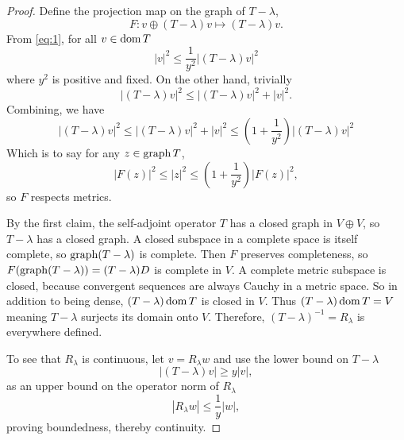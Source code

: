 \documentclass[11pt]{amsart}
\begin{document}
\begin{proof}
		Define the projection map on the graph of $T-\lambda$,
			\begin{equation*}
				F:v\oplus(T-\lambda)v \longmapsto (T-\lambda)v.
			\end{equation*}
		From \eqref{eq:1}, for all $v \in \operatorname{dom} T$ 
			\begin{equation*}
				|v|^2 \leq \frac{1}{y^2} |(T-\lambda)v|^2
			\end{equation*}
		where $y^2$ is positive and fixed. On the other hand, trivially
			\begin{equation*}
				|(T-\lambda)v|^2 \leq |(T-\lambda)v|^2 +|v|^2.
			\end{equation*}
		Combining, we have 
			\begin{equation*}
				|(T-\lambda)v|^2 \leq |(T-\lambda)v|^2 +|v|^2 \leq (1+\frac{1}{y^2}) |(T-\lambda)v|^2
			\end{equation*}
		Which is to say for any $z \in \operatorname{graph} T$,
			\begin{equation*}
				|F(z)|^2 \leq |z|^2 \leq (1+\frac{1}{y^2})|F(z)|^2,
			\end{equation*}
		so $F$ respects metrics.
		
		By the first claim, the self-adjoint operator $T$ has a closed graph in $V \oplus V$,  so $T-\lambda$ has a closed graph. A closed subspace in a complete space is itself complete, so $\operatorname{graph} (T-\lambda)$ is complete. Then $F$ preserves completeness, so $F(\operatorname{graph}(T-\lambda))=(T-\lambda)D$ is complete in $V$. A  complete metric subspace is closed, because convergent sequences are always Cauchy in a metric space. So in addition to being dense, $(T-\lambda)\operatorname{dom} T$ is closed in $V$. Thus $(T-\lambda)\operatorname{dom} T=V$ meaning $T-\lambda$ surjects its domain onto $V$. Therefore, $(T-\lambda)^{-1}=R_\lambda$ is everywhere defined. 
		
		To see that $R_\lambda$ is continuous, let $v=R_\lambda w$ and use the lower bound on $T-\lambda$
			\begin{equation*}
				|(T-\lambda)v|\geq y|v|,
			\end{equation*}
		as an upper bound on the operator norm of $R_\lambda$
			\begin{equation*}
				|R_\lambda w| \leq \frac{1}{y} |w|,
			\end{equation*}
		proving boundedness, thereby continuity.
		

\end{proof}
\end{document}
